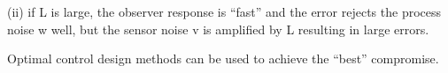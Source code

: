 (ii)	if  L  is large, the observer response is “fast” and the error rejects the process noise  w  well, but the sensor noise  v  is amplified by  L  resulting in large errors.

Optimal control design methods can be used to achieve the “best” compromise.




\endinput

